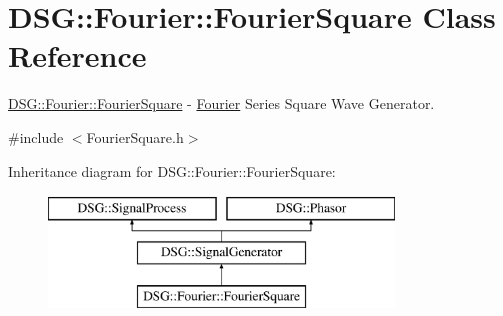 \hypertarget{class_d_s_g_1_1_fourier_1_1_fourier_square}{\section{D\+S\+G\+:\+:Fourier\+:\+:Fourier\+Square Class Reference}
\label{class_d_s_g_1_1_fourier_1_1_fourier_square}
}


\hyperlink{class_d_s_g_1_1_fourier_1_1_fourier_square}{D\+S\+G\+::\+Fourier\+::\+Fourier\+Square} -\/ \hyperlink{namespace_d_s_g_1_1_fourier}{Fourier} Series Square Wave Generator.  




{\ttfamily \#include $<$Fourier\+Square.\+h$>$}

Inheritance diagram for D\+S\+G\+:\+:Fourier\+:\+:Fourier\+Square\+:\begin{figure}[H]
\begin{center}
\leavevmode
\includegraphics[height=3.000000cm]{class_d_s_g_1_1_fourier_1_1_fourier_square}
\end{center}
\end{figure}
